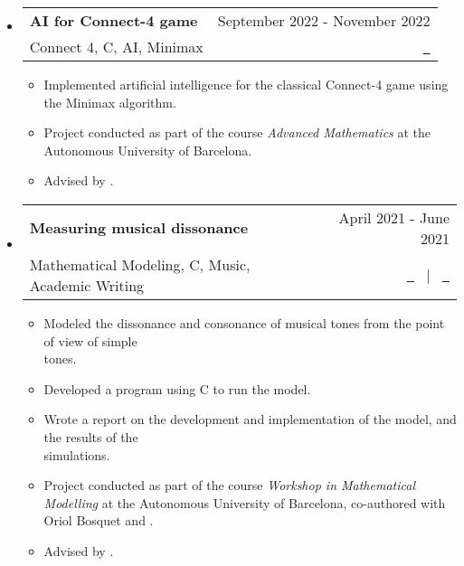 \documentclass[a4paper,11pt]{article}
\makeatletter
\newcommand{\resumeQuadHeading}[4]{
  \item
  \begin{tabular*}{0.96\textwidth}[t]{l@{\extracolsep{\fill}}r}
    \textbf{#1} & \small #2 \\
    \small#3 & \small #4 \\
  \end{tabular*}
}
\newcommand{\resumeHeadingListStart}{
  \begin{itemize}[leftmargin=0.15in, label={}]
}
\newcommand{\resumeHeadingListEnd}{\end{itemize}}
\makeatother
\begin{document}
\resumeHeadingListStart{}
\resumeQuadHeading{AI for Connect-4 game}{September 2022 - November 2022}{Connect 4, C, AI, Minimax}{\href{https://github.com/victorballester7/connect4}{\faGithub \ \graydotuline{Code}}}
\begin{itemize}[leftmargin=3em, itemsep=0.1em, topsep=2pt]
  \item \small Implemented artificial intelligence for the classical Connect-4 game using the Minimax algorithm.
  \item \small Project conducted as part of the course \textit{Advanced Mathematics} at the Autonomous University of Barcelona.
  \item \small Advised by \href{https://portalrecerca.uab.cat/en/persons/vicente-soler-ruz}{}.
\end{itemize}
\resumeHeadingListEnd{}


\resumeHeadingListStart{}
\resumeQuadHeading{Measuring musical dissonance}{April 2021 - June 2021}{Mathematical Modeling, C, Music, Academic Writing}{\href{https://github.com/victorballester7/dissonance/blob/main/latex/main.pdf}{\faFileTextO \ \graydotuline{{Report \scriptsize (in Catalan)}}} \ $|$ \ \href{https://github.com/victorballester7/dissonance}{\faGithub \ \graydotuline{Code}}}
\begin{itemize}[leftmargin=3em, itemsep=0.1em, topsep=2pt]
  \item \small Modeled the dissonance and consonance of musical tones from the point of view of simple\\ tones.
  \item \small Developed a program using C to run the model.
  \item \small Wrote a report on the development and implementation of the model, and the results of the\\ simulations.
  \item \small Project conducted as part of the course \textit{Workshop in Mathematical Modelling} at the Autonomous University of Barcelona, co-authored with Oriol Bosquet and \href{https://github.com/carlosala}{}.
  \item \small Advised by \href{https://mat.uab.cat/departament/uab/pop_ex.php?id=208&lang=}{}.
\end{itemize}
\resumeHeadingListEnd{}
\end{document}
